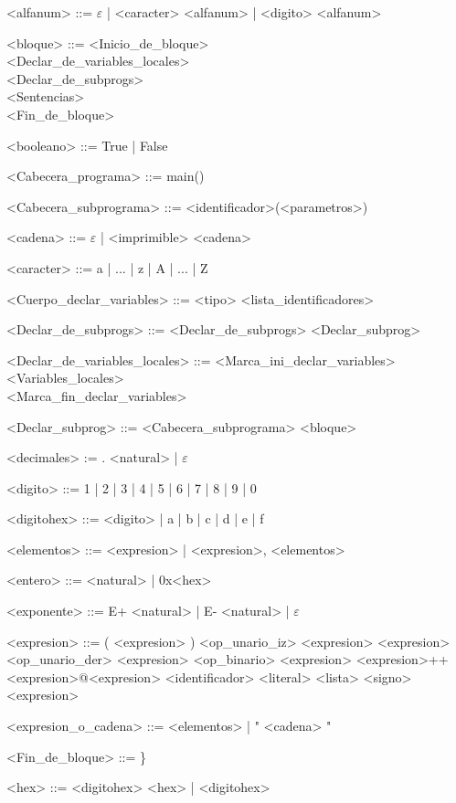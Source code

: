 \documentclass{scrartcl}
\begin{document}
\setlength{\grammarparsep}{4pt plus 1pt minus 1pt}
\begin{grammar}

<alfanum> ::= $\varepsilon$ | <caracter> <alfanum> | <digito> <alfanum>

<bloque> ::= <Inicio_de_bloque> \\
 <Declar_de_variables_locales> \\
 <Declar_de_subprogs> \\
 <Sentencias> \\
 <Fin_de_bloque>

<booleano> ::= True | False

<Cabecera_programa> ::= main()

<Cabecera_subprograma> ::= <identificador>(<parametros>)

<cadena> ::= $\varepsilon$ | <imprimible> <cadena>

<caracter> ::= a | ... | z | A | ... | Z

<Cuerpo_declar_variables> ::= <tipo> <lista_identificadores>

<Declar_de_subprogs> ::= <Declar_de_subprogs> <Declar_subprog>

<Declar_de_variables_locales> ::= <Marca_ini_declar_variables> \\
<Variables_locales> \\
<Marca_fin_declar_variables>

<Declar_subprog> ::= <Cabecera_subprograma> <bloque>

<decimales> := . <natural> | $\varepsilon$

<digito> ::= 1 | 2 | 3 | 4 | 5 | 6 | 7 | 8 | 9 | 0

<digitohex> ::= <digito> | a | b | c | d | e | f

<elementos> ::= <expresion> | <expresion>, <elementos>

<entero> ::= <natural> | 0x<hex>

<exponente> ::= E+ <natural> | E- <natural> | $\varepsilon$

<expresion> ::= ( <expresion> )
\alt <op_unario_iz> <expresion>
\alt <expresion> <op_unario_der>
\alt <expresion> <op_binario> <expresion>
\alt <expresion>++<expresion>@<expresion>
\alt <identificador>
\alt <literal>
\alt <lista>
\alt <signo> <expresion>

<expresion_o_cadena> ::= <elementos> | " <cadena> "

<Fin_de_bloque> ::= \}

<hex> ::= <digitohex> <hex> | <digitohex>


\end{grammar}
\end{document}

